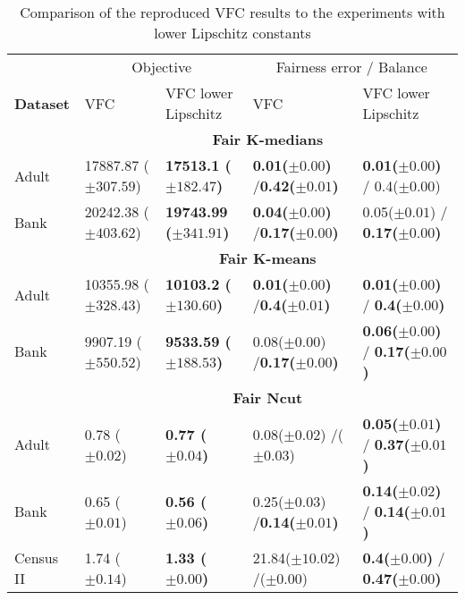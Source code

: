 \begin{table}[]
	\small
	\centering
	\begin{tabular}{|m{1.4cm}|m{1.8cm}|m{2cm}|m{1.9cm}|m{4.1cm}|}
		\hline
		& \multicolumn{2}{c|}{Objective} &   \multicolumn{2}{c|}{Fairness error / Balance} \\ \cline{2-5}
		\textbf{Dataset} & VFC & VFC lower Lipschitz & VFC & VFC lower Lipschitz \\ \cline{2-5}
		& \multicolumn{4}{c|}{\textbf{Fair $\boldsymbol{K}$-medians}} \\
		\hline
		Adult 		& 17887.87 ($\pm 307.59$) 	& \textbf{17513.1 ($\pm 182.47$)} 	& \textbf{0.01($\pm 0.00$)} /\;\textbf{0.42($\pm 0.01$)} & \textbf{0.01($\pm 0.00$)} / 0.4($\pm 0.00$) \\
		Bank 		& 20242.38 ($\pm 403.62$) 	& \textbf{19743.99 ($\pm 341.91$)} 	& \textbf{0.04($\pm 0.00$)} /\;\textbf{0.17($\pm 0.00$)} & 0.05($\pm 0.01$) / \textbf{0.17($\pm 0.00$)} \\
		\hline
		& \multicolumn{4}{c|}{\textbf{Fair $\boldsymbol{K}$-means}} \\
		\cline{2-5}
		\hline
		Adult 		& 10355.98 ($\pm 328.43$) 	& \textbf{10103.2 ($\pm 130.60$)} 	& \textbf{0.01($\pm 0.00$)} /\;\textbf{0.4($\pm 0.01$)} 	& \textbf{0.01($\pm 0.00$)} / \textbf{0.4($\pm 0.00$)} \\
		Bank 		& 9907.19 ($\pm 550.52$) 	& \textbf{9533.59 ($\pm 188.53$)} 	& 0.08($\pm 0.00$) /\;\textbf{0.17($\pm 0.00$)} 			& \textbf{0.06($\pm 0.00$)} / \textbf{0.17($\pm 0.00$)} \\
		\hline
		& \multicolumn{4}{c|}{\textbf{Fair Ncut}} \\
		\cline{2-5}
		\hline
		Adult 		& 0.78 ($\pm 0.02$) 		& \textbf{0.77 ($\pm 0.04$)} 		& 0.08($\pm 0.02$) /\;0.36($\pm 0.03$) 					& \textbf{0.05($\pm 0.01$)} / \textbf{0.37($\pm 0.01$)} \\
		Bank 		& 0.65 ($\pm 0.01$) 		& \textbf{0.56 ($\pm 0.06$)} 		& 0.25($\pm 0.03$) /\;\textbf{0.14($\pm 0.01$)} 			& \textbf{0.14($\pm 0.02$)} / \textbf{0.14($\pm 0.01$)} \\
		Census II 	& 1.74 ($\pm 0.14$) 		& \textbf{1.33 ($\pm 0.00$)} 		& 21.84($\pm 10.02$) /\;0.0($\pm 0.00$) 					& \textbf{0.4($\pm 0.00$)} / \textbf{0.47($\pm 0.00$)} \\
		\hline        
	\end{tabular}
	\caption{Comparison of the reproduced VFC results to the experiments with lower Lipschitz constants}
	\label{tab:comparison_lmbda-tuned-allVSLipschitz-test}
\end{table}

